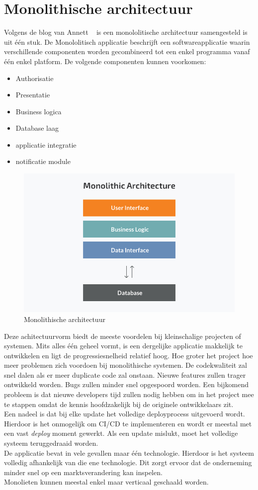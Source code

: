 \section{Monolithische architectuur}
Volgens de blog van Annett ~\autocite{Monolith2014} is een monololitische architectuur samengesteld is uit één stuk. De Monololitisch applicatie beschrijft een softwareapplicatie waarin verschillende componenten worden gecombineerd tot een enkel programma vanaf één enkel platform. De volgende componenten kunnen voorkomen:
\begin{itemize}
    \item Authorisatie
    \item Presentatie
    \item Business logica
    \item Database laag
    \item applicatie integratie
    \item notificatie module
\end{itemize}
\begin{figure}[!htb]
    \caption{Monolithische architectuur}
    \centering
    \includegraphics[width=1\textwidth]{Monoliet.png}
\end{figure}
Deze achitectuurvorm biedt de meeste voordelen bij kleinschalige projecten of systemen. Mits alles één geheel vormt, is een dergelijke applicatie makkelijk te ontwikkelen en ligt de progressiesnelheid relatief hoog. Hoe groter het project hoe meer problemen zich voordoen bij monolithische systemen. De codekwaliteit zal snel dalen als er meer duplicate code zal onstaan. Nieuwe features zullen trager ontwikkeld worden. Bugs zullen minder snel opgespoord worden. Een bijkomend probleem is dat nieuwe developers tijd zullen nodig hebben om in het project mee te stappen omdat de kennis hoofdzakelijk bij de originele ontwikkelaars zit. \\
Een nadeel is dat bij elke update het volledige deployprocess uitgevoerd wordt. Hierdoor is het onmogelijk om CI/CD te implementeren en wordt er meestal met een vast \emph{deploy} moment gewerkt. Als een update mislukt, moet het volledige systeem teruggedraaid worden.\\
De applicatie bevat in vele gevallen maar één technologie. Hierdoor is het systeem volledig afhankelijk van die ene technologie. Dit zorgt ervoor dat de onderneming minder snel op een marktsverandering kan inspelen.\\
Monolieten kunnen meestal enkel maar verticaal geschaald worden.
